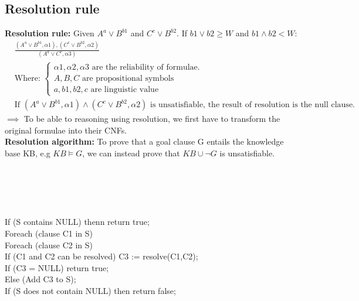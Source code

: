 \documentclass[part1.tex]{subfiles}
\begin{document}
\subsection{Resolution rule}
{\bfseries Resolution rule:} Given \(A^a \vee B^{b1}\) and \(C^c \vee B^{b2}\). If \(b1 \vee b2 
\ge W\) and \(b1 \wedge b2 < W\):
\begin{align*}
	&\frac{(A^a \vee B^{b1}, {\alpha 1}), (C^c \vee B^{b2}, {\alpha 2})} {(A^a \vee C^c, {\alpha 3})}\\
	&\text{Where: }
	\begin{cases}
	\alpha 1, \alpha 2, \alpha 3 \text{ are the reliability of formulae.}\\
	A, B, C \text{ are propositional symbols}\\
	a, b1, b2, c \text{ are linguistic value}
	\end{cases}
	\\
	&\text{If } (A^a \vee B^{b1}, {\alpha 1}) \wedge (C^c \vee B^{b2}, {\alpha 2}) \text{ is 
	unsatisfiable, the result of resolution is the null clause.} 
\end{align*}
\(\implies\) To be able to reasoning using resolution, we first have to transform the original
formulae into their CNFs.\\


{\bfseries Resolution algorithm:} 
 To prove that a goal clause G entails the knowledge base KB, e.g \(KB \models G\), we can instead prove
that \(KB \cup \neg G\) is unsatisfiable.\\\\
\\
\\\\
\\
\indent If (S contains NULL) thenn return true;\\
\indent Foreach (clause C1 in S)\\
\indent \indent Foreach (clause C2 in S)\\
\indent \indent \indent If (C1 and C2 can be resolved) C3 := resolve(C1,C2);\\
\indent \indent \indent If (C3 = NULL) return true;\\
\indent \indent \indent Else (Add C3 to S);\\
\indent If (S does not contain NULL) then return false;\\
\\
\end{document}

